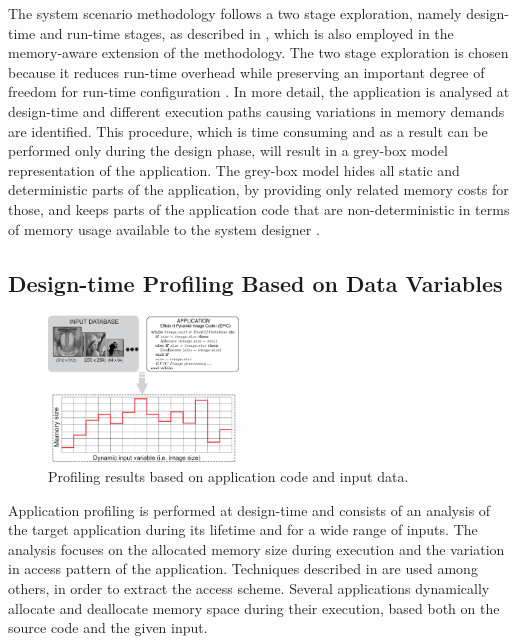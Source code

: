 \documentclass[a4paper,conference]{IEEEtran}
\begin{document}
The system scenario methodology follows a two stage exploration, namely design-time and run-time stages, as described in \cite{Gheorghita2007}, which is also employed in the memory-aware extension of the methodology. The two stage exploration is chosen because it reduces run-time overhead while preserving an important degree of freedom for run-time configuration \cite{tcm}. In more detail, the application is analysed at design-time and different execution paths causing variations in memory demands are identified. This procedure, which is time consuming and as a result can be performed only during the design phase, will result in a grey-box model representation of the application. The grey-box model hides all static and deterministic parts of the application, by providing only related memory costs for those, and keeps parts of the application code that are non-deterministic in terms of memory usage available to the system designer \cite{graybox}. 


\subsection{Design-time Profiling Based on Data Variables}

\begin{figure}[!t]
\centering
\includegraphics[width=0.45\textwidth]{Images/profiling2.eps}
\caption{Profiling results based on application code and input data.}
\label{fig:profiling}
\end{figure}

Application profiling is performed at design-time and consists of an analysis of the target application during its lifetime and for a wide range of inputs. The analysis focuses on the allocated memory size during execution and the variation in access pattern of the application. Techniques described in \cite{Ang13b} are used among others, in order to extract the access scheme. Several applications dynamically allocate and deallocate memory space during their execution, based both on the source code and the given input. 
\end{document}
